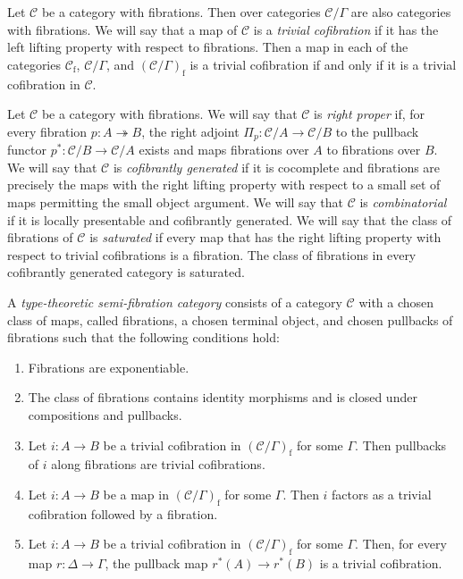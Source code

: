 \documentclass[reqno]{amsart}
\theoremstyle{definition}
\theoremstyle{remark}
\newcommand{\fs}[1]{\mathrm{#1}}
\newcommand{\scat}[1]{\mathcal{#1}}
\numberwithin{figure}{section}
\begin{document}
Let $\scat{C}$ be a category with fibrations.
Then over categories $\scat{C}/\Gamma$ are also categories with fibrations.
We will say that a map of $\scat{C}$ is a \emph{trivial cofibration} if it has the left lifting property with respect to fibrations.
Then a map in each of the categories $\scat{C}_\fs{f}$, $\scat{C}/\Gamma$, and $(\scat{C}/\Gamma)_\fs{f}$ is a trivial cofibration if and only if it is a trivial cofibration in $\scat{C}$.

Let $\scat{C}$ be a category with fibrations.
We will say that $\scat{C}$ is \emph{right proper} if, for every fibration $p : A \twoheadrightarrow B$, the right adjoint $\Pi_p : \scat{C}/A \to \scat{C}/B$ to the pullback functor $p^* : \scat{C}/B \to \scat{C}/A$ exists and maps fibrations over $A$ to fibrations over $B$.
We will say that $\scat{C}$ is \emph{cofibrantly generated} if it is cocomplete and fibrations are precisely the maps with the right lifting property with respect to a small set of maps permitting the small object argument.
We will say that $\scat{C}$ is \emph{combinatorial} if it is locally presentable and cofibrantly generated.
We will say that the class of fibrations of $\scat{C}$ is \emph{saturated} if every map that has the right lifting property with respect to trivial cofibrations is a fibration.
The class of fibrations in every cofibrantly generated category is saturated.

\begin{defn}[ttsfc]
A \emph{type-theoretic semi-fibration category} consists of a category $\scat{C}$ with a chosen class of maps, called fibrations, a chosen terminal object, and chosen pullbacks of fibrations such that the following conditions hold:
\begin{enumerate}
\item \label{it:ttsfc-pi} Fibrations are exponentiable.
\item \label{it:ttsfc-fib} The class of fibrations contains identity morphisms and is closed under compositions and pullbacks.
\item Let $i : A \to B$ be a trivial cofibration in $(\scat{C}/\Gamma)_\fs{f}$ for some $\Gamma$.
Then pullbacks of $i$ along fibrations are trivial cofibrations.
\item \label{it:ttsfc-factor} Let $i : A \to B$ be a map in $(\scat{C}/\Gamma)_\fs{f}$ for some $\Gamma$.
Then $i$ factors as a trivial cofibration followed by a fibration.
\item Let $i : A \to B$ be a trivial cofibration in $(\scat{C}/\Gamma)_\fs{f}$ for some $\Gamma$.
Then, for every map $r : \Delta \to \Gamma$, the pullback map $r^*(A) \to r^*(B)$ is a trivial cofibration.
\end{enumerate}
\end{defn}
\end{document}
